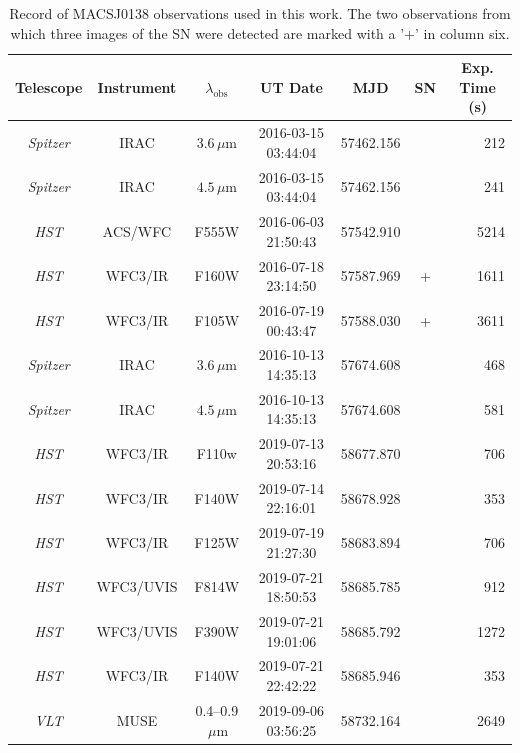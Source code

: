 \documentclass[12pt,dvipsnames]{article}
\begin{document}
\begin{table}[h]
\centering
\begin{tabular}{ccccccr}
    \multicolumn{1}{c}{Telescope} & \multicolumn{1}{c}{Instrument} & \multicolumn{1}{c}{$\lambda_\mathrm{obs}$} & \multicolumn{1}{c}{UT Date} & \multicolumn{1}{c}{MJD} & \multicolumn{1}{c}{SN} & \multicolumn{1}{c}{Exp. Time (s)}\\

\midrule
\textit{Spitzer} & IRAC      & $3.6\,\mu\mathrm{m}$      & 2016-03-15 03:44:04 & 57462.156 &   & 212 \\ %
\textit{Spitzer} & IRAC      & $4.5\,\mu\mathrm{m}$      & 2016-03-15 03:44:04 & 57462.156 &   & 241 \\
\textit{HST}     & ACS/WFC   & F555W                     & 2016-06-03 21:50:43 & 57542.910 &   & 5214 \\
\textit{HST}     & WFC3/IR   & F160W                     & 2016-07-18 23:14:50 & 57587.969 & + & 1611 \\
\textit{HST}     & WFC3/IR   & F105W                     & 2016-07-19 00:43:47 & 57588.030 & + & 3611 \\ 
\textit{Spitzer} & IRAC      & $3.6\,\mu\mathrm{m}$      & 2016-10-13 14:35:13 & 57674.608 &   & 468 \\ %
\textit{Spitzer} & IRAC      & $4.5\,\mu\mathrm{m}$      & 2016-10-13 14:35:13 & 57674.608 &   & 581 \\
\midrule
\textit{HST}     & WFC3/IR   & F110w                     & 2019-07-13 20:53:16 & 58677.870 &   & 706 \\ 
\textit{HST}     & WFC3/IR   & F140W                     & 2019-07-14 22:16:01 & 58678.928 &   & 353 \\ 
\textit{HST}     & WFC3/IR   & F125W                     & 2019-07-19 21:27:30 & 58683.894 &   & 706 \\ 
\textit{HST}     & WFC3/UVIS & F814W                     & 2019-07-21 18:50:53 & 58685.785 &   & 912 \\ 
\textit{HST}     & WFC3/UVIS & F390W                     & 2019-07-21 19:01:06 & 58685.792 &   & 1272 \\ 
\textit{HST}     & WFC3/IR   & F140W                     & 2019-07-21 22:42:22 & 58685.946 &   & 353 \\ 
\textit{VLT}     & MUSE      & 0.4--0.9$\,\mu\mathrm{m}$ & 2019-09-06 03:56:25 & 58732.164 &   & 2649  \\
\end{tabular}
\caption{Record of MACSJ0138 observations used in this work.  
The two observations from which three images of the SN were detected are marked with a '+' in column six.
\label{tab:observations}
}
\end{table}
\end{document}

